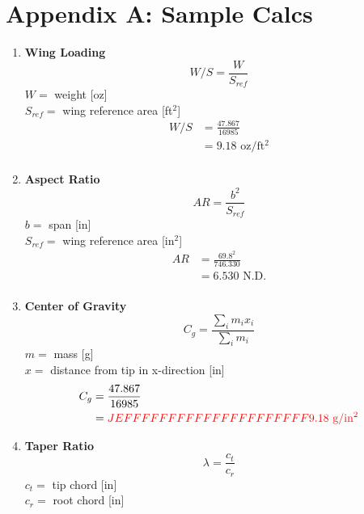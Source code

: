\section*{Appendix A: Sample Calcs}

\begin{enumerate}[wide,label=\textbf{\arabic*}., labelindent=0pt]

    \item \textbf{Wing Loading}
        \[W/S = \frac{W}{S_{ref}}\]
        $ W =$ weight [oz]\\
        $S_{ref} =$ wing reference area [ft$^2$]\\
        
        \begin{align*}
            W/S &= \frac{47.867}{16985}\\
            &= 9.18 \text{ oz/ft$^2$}\\
        \end{align*}
        
        \item \textbf{Aspect Ratio}
        \[AR = \frac{b^2}{S_{ref}}\]
        $ b =$ span [in]\\
        $S_{ref} =$ wing reference area [in$^2$]\\
        
        \begin{align*}
            AR &= \frac{69.8^2}{746.330}\\
            &= 6.530 \text{ N.D.}\\
        \end{align*}
    
    \item \textbf{Center of Gravity}
        \[C_g = \frac{\sum_i m_i x_i }{\sum_i m_i}\]
        $ m =$ mass [g]\\
        $ x =$ distance from tip in x-direction [in]\\
        
        \begin{align*}
            C_g &= \frac{47.867}{16985}\\
            &= \color{red}{JEFFFFFFFFFFFFFFFFFFFFF}9.18 \text{ g/in$^2$}\\
        \end{align*}
        
    \item \textbf{Taper Ratio}
        \[\lambda = \frac{c_t}{c_r}\]
        $ c_t =$ tip chord [in]\\
        $ c_r =$ root chord [in]\\
        

\end{enumerate}
